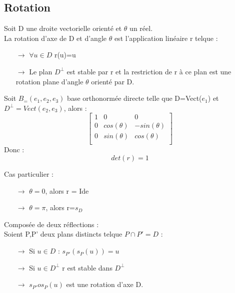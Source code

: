 \subsection{Rotation}
\begin{de}
Soit D une droite vectorielle orienté et $\theta$ un réel.\\
La rotation d'axe de D et d'angle $\theta$ est l'application linéaire r telque :
\begin{itemize}
 \item[$\rightarrow$]$\forall u \in D$ r(u)=u
 \item[$\rightarrow$]Le plan $D^{\bot}$ est stable par r et la restriction de r à ce plan est une rotation plane d'angle $\theta$ orienté par D.
\end{itemize}
\end{de}
\begin{prop}


Soit $B_=(e_1,e_2,e_3)$ base orthonormée directe telle que D=Vect($e_1$) et $D^{\bot}=Vect(e_2,e_3)$, alors : 
$$\begin{bmatrix}
 1 & 0 &  0\\
  0 & cos(\theta) & -sin(\theta)\\
 0 & sin(\theta) & cos(\theta) \\
\end{bmatrix}$$
Donc : $$det(r) = 1$$
 
\end{prop}
\begin{prop}
Cas particulier :
\begin{itemize}
 \item[$\rightarrow$] $\theta = 0$, alors r = Ide
 \item[$\rightarrow$] $\theta = \pi$, alors r=$s_D$
\end{itemize}
\end{prop}
\begin{prop}
Composée de deux réflections :\\
Soient P,P' deux plans distincts telque $P\cap P' = D$ :
\begin{itemize}
 \item[$\rightarrow$] Si $u \in D$ : $s_{P'}(s_P(u))=u$
 \item[$\rightarrow$] Si $u \in D^{\bot}$ r est stable dans $D^{\bot}$
  \item[$\rightarrow$] $s_{P'}o s_P(u)$ est une rotation d'axe D.
\end{itemize}
\end{prop}
